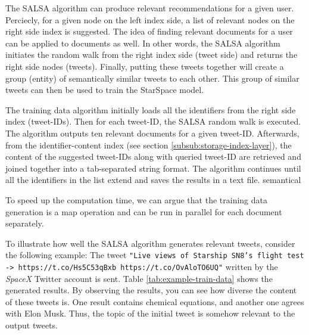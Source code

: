 The SALSA algorithm can produce relevant recommendations for a given user. Perciecly, for a given node on the left index side, a list of relevant nodes on the right side index is suggested. The idea of finding relevant documents for a user can be applied to documents as well. In other words, the SALSA algorithm initiates the random walk from the right index side (tweet side) and returns the right side nodes (tweets). Finally, putting these tweets together will create a group (entity) of semantically similar tweets to each other. This group of similar tweets can then be used to train the StarSpace model.


The training data algorithm initially loads all the identifiers from the right side index (tweet-IDs). Then for each tweet-ID, the SALSA random walk is executed. The algorithm outputs ten relevant documents for a given tweet-ID. Afterwards, from the identifier-content index (see section \ref{subsub:storage-index-layer}), the content of the suggested tweet-IDs along with queried tweet-ID are retrieved and joined together into a tab-separated string format. The algorithm continues until all the identifiers in the list extend and saves the results in a text file.
semantical

To speed up the computation time, we can argue that the training data generation is a map operation and can be run in parallel for each document separately.


To illustrate how well the SALSA algorithm generates relevant tweets, consider the following example:
The tweet \texttt{"Live views of Starship SN8’s flight test -> https://t.co/Hs5C53qBxb https://t.co/OvAloTO6UQ"} written by the \emph{SpaceX} Twitter account is sent. Table \ref{tab:example-train-data} shows the generated results. By observing the results, you can see how diverse the content of these tweets is. One result contains chemical equations, and another one agrees with Elon Musk. Thus, the topic of the initial tweet is somehow relevant to the output tweets.

